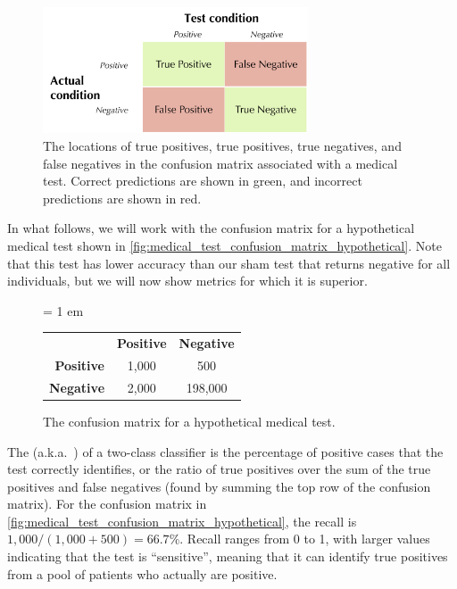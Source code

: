 \begin{figure}[h]
\centering
\mySfFamily
\includegraphics[width = 0.7\textwidth]{../images/medical_test_confusion_matrix.png}
\caption{The locations of true positives, true positives, true negatives, and false negatives in the confusion matrix associated with a medical test. Correct predictions are shown in green, and incorrect predictions are shown in red.}
\label{fig:medical_test_confusion_matrix}
\end{figure}

In what follows, we will work with the confusion matrix for a hypothetical medical test shown in \autoref{fig:medical_test_confusion_matrix_hypothetical}. Note that this test has lower accuracy than our sham test that returns negative for all individuals, but we will now show metrics for which it is superior.\\

\begin{figure}[h]
\centering
\tabcolsep = 1 em
\mySfFamily
{}
\begin{tabular}{r c c}
\rowcolor{gray!50}
& \textbf{Positive} & \textbf{Negative} \\
 \textbf{Positive} & 1,000 & \phantom{198,}500 \\
\textbf{Negative} & 2,000 & 198,000 \\
\end{tabular}
\caption{The confusion matrix for a hypothetical medical test.}
\label{fig:medical_test_confusion_matrix_hypothetical}
\end{figure}


The  (a.k.a.~) of a two-class classifier is the percentage of positive cases that the test correctly identifies, or the ratio of true positives over the sum of the true positives and false negatives (found by summing the top row of the confusion matrix). For the confusion matrix in \autoref{fig:medical_test_confusion_matrix_hypothetical}, the recall is $1,000/(1,000 + 500) = 66.7\%$. Recall ranges from 0 to 1, with larger values indicating that the test is ``sensitive'', meaning that it can identify true positives from a pool of patients who actually are positive.

